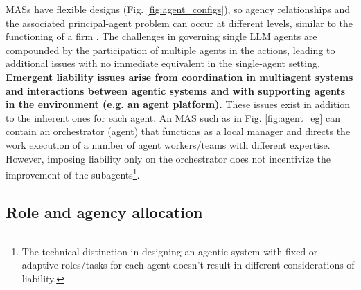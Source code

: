 \documentclass[11pt]{article}
\begin{document}
MASs have flexible designs (Fig. \ref{fig:agent_configs}), so agency relationships and the associated principal-agent problem can occur at different levels, similar to the functioning of a firm \citep{fama_agency_1980}. The challenges in governing single LLM agents are compounded by the participation of multiple agents in the actions, leading to additional issues with no immediate equivalent in the single-agent setting. \textbf{Emergent liability issues arise from coordination in multiagent systems and interactions between agentic systems and with supporting agents in the environment (e.g. an agent platform).} These issues exist in addition to the inherent ones for each agent. An MAS such as in Fig. \ref{fig:agent_eg} can contain an orchestrator (agent) that functions as a local manager and directs the work execution of a number of agent workers/teams with different expertise. However, imposing liability only on the orchestrator does not incentivize the improvement of the subagents\footnote{The technical distinction in designing an agentic system with fixed or adaptive roles/tasks for each agent doesn't result in different considerations of liability.}.

\subsection{Role and agency allocation}

\end{document}
